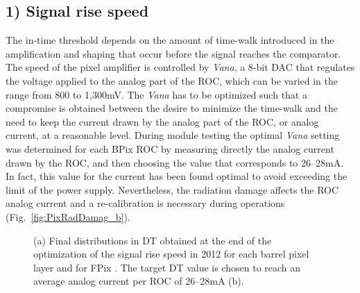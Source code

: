 \subsection*{1) Signal rise speed}

The in-time threshold depends on the amount of time-walk introduced in the amplification and shaping that occur before the signal reaches the comparator.
The speed of the pixel amplifier is controlled by \textit{Vana}, a 8-bit DAC that regulates the voltage applied to the analog part of the ROC, which can be varied in the range from 800 to 1,300\unit{mV}.
The \textit{Vana} has to be optimized such that a compromise is obtained between the desire to minimize the time-walk and the need to keep the current drawn by the analog part of the ROC, or analog current, at a reasonable level.
During module testing the optimal \textit{Vana} setting was determined for each BPix ROC by measuring directly the analog current drawn by the ROC, and then choosing the value that corresponds to 26--28\unit{mA}.
In fact, this value for the current has been found optimal to avoid exceeding the limit of the power supply.
Nevertheless, the radiation damage affects the ROC analog current and a re-calibration is necessary during operations (Fig.~\ref{fig:PixRadDamag_b}). 

\begin{figure}[!htb]
 \begin{center}
 \end{center}
 \caption{(a) Final distributions in DT obtained at the end of the optimization of the signal rise speed in 2012 for each barrel pixel layer and for FPix . The target DT value is chosen to reach an average analog current per ROC of 26--28\unit{mA} (b).}
 \label{fig:VanaCalib2012}
\end{figure}

